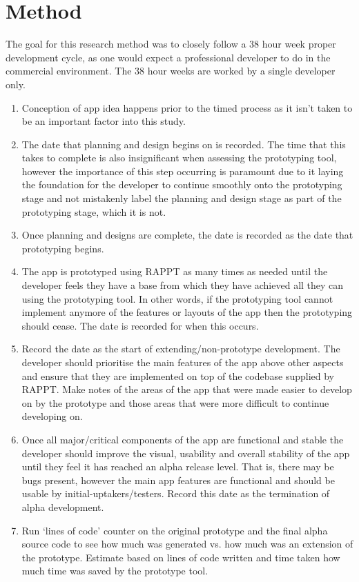 \documentclass[11pt,english,numbers=endperiod,parskip=half,abstract=on]{scrreprt}
\begin{document}
\section{Method}
  The goal for this research method was to closely follow a 38 hour week
  proper development cycle, as one would expect a professional developer to
  do in the commercial environment. The 38 hour weeks are worked by a single
  developer only.
  \begin{enumerate}
    \item{
      Conception of app idea happens prior to the timed process as it isn't
      taken to be an important factor into this study.
    }
    \item{
      The date that planning and design begins on is recorded. The time that
      this takes to complete is also insignificant when assessing the prototyping
      tool, however the importance of this step occurring is paramount due to it
      laying the foundation for the developer to continue smoothly onto the
      prototyping stage and not mistakenly label the planning and design stage
      as part of the prototyping stage, which it is not.
    }
    \item{
      Once planning and designs are complete, the date is recorded as the
      date that prototyping begins.
    }
    \item{
      The app is prototyped using RAPPT as many times as needed until the
      developer feels they have a base from which they have achieved all they
      can using the prototyping tool. In other words, if the prototyping tool
      cannot implement anymore of the features or layouts of the app then
      the prototyping should cease. The date is recorded for when this occurs.
    }
    \item{
      Record the date as the start of extending/non-prototype development.
      The developer should prioritise the main features of the app above other
      aspects and ensure that they are implemented on
      top of the codebase supplied by RAPPT. Make notes of the areas of the app
      that were made easier to develop on by the prototype and those areas
      that were more difficult to continue developing on.
    }
    \item{
      Once all major/critical components of the app are functional and stable
      the developer should improve the visual, usability and overall stability
      of the app until they feel it has reached an alpha release level. That is,
      there may be bugs present, however the main app features are functional
      and should be usable by initial-uptakers/testers. Record this date
      as the termination of alpha development.
    }
    \item{
      Run `lines of code' counter on the original prototype and the final alpha
      source code to see how much was generated vs. how much was an extension
      of the prototype. Estimate based on lines of code written and time taken
      how much time was saved by the prototype tool.
    }
  \end{enumerate}
\end{document}
